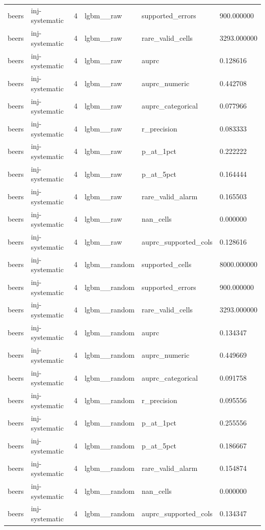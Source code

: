 \begin{tabular}{llllll}
beers & inj-systematic & 4 & lgbm\_\_raw & supported\_errors & 900.000000 \\
beers & inj-systematic & 4 & lgbm\_\_raw & rare\_valid\_cells & 3293.000000 \\
beers & inj-systematic & 4 & lgbm\_\_raw & auprc & 0.128616 \\
beers & inj-systematic & 4 & lgbm\_\_raw & auprc\_numeric & 0.442708 \\
beers & inj-systematic & 4 & lgbm\_\_raw & auprc\_categorical & 0.077966 \\
beers & inj-systematic & 4 & lgbm\_\_raw & r\_precision & 0.083333 \\
beers & inj-systematic & 4 & lgbm\_\_raw & p\_at\_1pct & 0.222222 \\
beers & inj-systematic & 4 & lgbm\_\_raw & p\_at\_5pct & 0.164444 \\
beers & inj-systematic & 4 & lgbm\_\_raw & rare\_valid\_alarm & 0.165503 \\
beers & inj-systematic & 4 & lgbm\_\_raw & nan\_cells & 0.000000 \\
beers & inj-systematic & 4 & lgbm\_\_raw & auprc\_supported\_cols & 0.128616 \\
beers & inj-systematic & 4 & lgbm\_\_random & supported\_cells & 8000.000000 \\
beers & inj-systematic & 4 & lgbm\_\_random & supported\_errors & 900.000000 \\
beers & inj-systematic & 4 & lgbm\_\_random & rare\_valid\_cells & 3293.000000 \\
beers & inj-systematic & 4 & lgbm\_\_random & auprc & 0.134347 \\
beers & inj-systematic & 4 & lgbm\_\_random & auprc\_numeric & 0.449669 \\
beers & inj-systematic & 4 & lgbm\_\_random & auprc\_categorical & 0.091758 \\
beers & inj-systematic & 4 & lgbm\_\_random & r\_precision & 0.095556 \\
beers & inj-systematic & 4 & lgbm\_\_random & p\_at\_1pct & 0.255556 \\
beers & inj-systematic & 4 & lgbm\_\_random & p\_at\_5pct & 0.186667 \\
beers & inj-systematic & 4 & lgbm\_\_random & rare\_valid\_alarm & 0.154874 \\
beers & inj-systematic & 4 & lgbm\_\_random & nan\_cells & 0.000000 \\
beers & inj-systematic & 4 & lgbm\_\_random & auprc\_supported\_cols & 0.134347 \\

\end{tabular}
